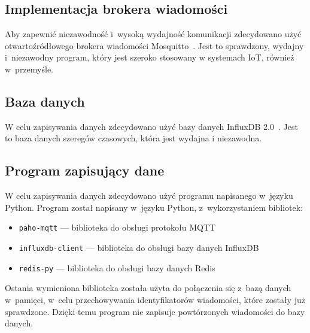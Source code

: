 \subsection{Implementacja brokera wiadomości}
Aby zapewnić niezawodność i~wysoką wydajność komunikacji zdecydowano użyć otwartoźródłowego brokera wiadomości Mosquitto~\cite{tool:mosquitto}.
Jest to sprawdzony, wydajny i~niezawodny program, który jest szeroko stosowany w systemach IoT, również w~przemyśle.~\cite{tool:mosquitto}

\subsection{Baza danych}
W celu zapisywania danych zdecydowano użyć bazy danych InfluxDB 2.0~\cite{tool:influxdb}. Jest to baza danych szeregów czasowych, która jest wydajna i niezawodna.~\cite{tool:influxdb}

\subsection{Program zapisujący dane}
W celu zapisywania danych zdecydowano użyć programu napisanego w~języku Python.
Program został napisany w~języku Python, z~wykorzystaniem bibliotek:
\begin{itemize}
    \item \texttt{paho-mqtt} — biblioteka do obsługi protokołu MQTT~\cite{py:paho-mqtt}
    \item \texttt{influxdb-client} — biblioteka do obsługi bazy danych InfluxDB~\cite{py:influxdb}
    \item \texttt{redis-py} — biblioteka do obsługi bazy danych Redis~\cite{py:redis}
\end{itemize}
Ostania wymieniona biblioteka została użyta do połączenia się z~bazą danych w~pamięci, w~celu przechowywania identyfikatorów wiadomości, które zostały już sprawdzone.
Dzięki temu program nie zapisuje powtórzonych wiadomości do bazy danych.
